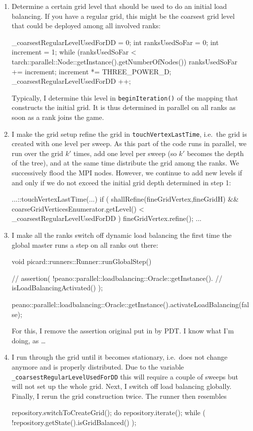 \begin{enumerate}
  \item Determine a certain grid level that should be used to do an initial load
  balancing. If you have a regular grid, this might be the coarsest grid level
  that could be deployed among all involved ranks:
  \begin{code}
_coarsestRegularLevelUsedForDD = 0;
int ranksUsedSoFar             = 0;
int increment                  = 1;
while (ranksUsedSoFar < tarch::parallel::Node::getInstance().getNumberOfNodes()) {
  ranksUsedSoFar += increment;
  increment      *= THREE_POWER_D;
  _coarsestRegularLevelUsedForDD ++;
}
  \end{code}
  Typically, I determine this level in \texttt{beginIteration()} of the mapping
  that constructs the initial grid. It is thus determined in parallel on all
  ranks as soon as a rank joins the game.
  \item I make the grid setup refine the grid in \texttt{touchVertexLastTime},
  i.e.~the grid is created with one level per sweep. As this part of the code
  runs in parallel, we run over the grid $k'$ times, add one level per sweep (so
  $k'$ becomes the depth of the tree), and at the same time distribute the grid
  among the ranks. We successively flood the MPI nodes. However, we continue to
  add new levels if and only if we do not exceed the initial grid depth
  determined in step 1:
  \begin{code}
...::touchVertexLastTime(...) {
  if (
    shallRefine(fineGridVertex,fineGridH)
    &&
    coarseGridVerticesEnumerator.getLevel() < _coarsestRegularLevelUsedForDD
  ) {
    fineGridVertex.refine();
  }
  ...
}  
  \end{code}
  \item I make all the ranks switch off dynamic load balancing the first time
  the global master runs a step on all ranks out there:
  \begin{code}
void picard::runners::Runner::runGlobalStep() {
  // assertion( !peano::parallel::loadbalancing::Oracle::getInstance().
  // isLoadBalancingActivated() );

  peano::parallel::loadbalancing::Oracle::getInstance().activateLoadBalancing(false);
}
  \end{code}
  For this, I remove the assertion original put in by PDT. I know what I'm
  doing, as \ldots
  \item I run through the grid until it becomes stationary, i.e.~does not change
  anymore and is properly distributed. Due to the variable
  \texttt{\_coarsestRegularLevelUsedForDD} this will require a couple of sweeps
  but will not set up the whole grid. Next, I switch off load balancing
  globally. Finally, I rerun the grid construction twice. The runner then
  resembles
  \begin{code}
repository.switchToCreateGrid();
do {
  repository.iterate();
} while ( !repository.getState().isGridBalanced() );


\end{code}
\end{enumerate}
